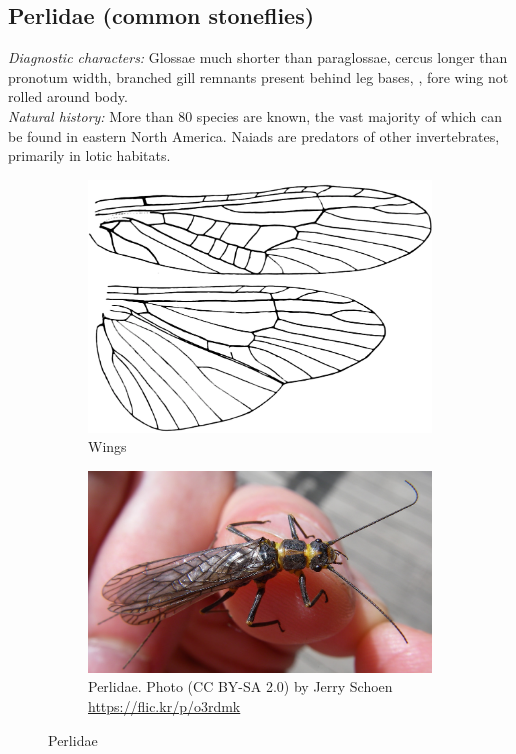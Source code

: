 \documentclass[letterpaper, 11pt]{article}
\begin{document}
\subsection{Perlidae (common stoneflies)}
\noindent{}\textit{Diagnostic characters:} Glossae much shorter than paraglossae, cercus longer than pronotum width, branched gill remnants present behind leg bases, , fore wing not rolled around body.\\

\noindent{}\textit{Natural history:} More than 80 species are known, the vast majority of which can be found in eastern North America. Naiads are predators of other invertebrates, primarily in lotic habitats.\\ 

\begin{figure}[ht!]
    \centering
    \begin{subfigure}[ht!]{0.45\textwidth}
        \includegraphics[width=\textwidth]{PerlidWings}
        \caption{Wings \citep[modified from][Plate 11, Fig. 3]{bhl29875}}
        \label{fig:perlid1}
    \end{subfigure}
    \qquad
    \begin{subfigure}[ht!]{0.45\textwidth}
        \includegraphics[width=\textwidth]{perlid}
        \caption{Perlidae. Photo (CC BY-SA 2.0) by Jerry Schoen \url{https://flic.kr/p/o3rdmk}}
        \label{fig:perlid2}
    \end{subfigure}
    \caption{Perlidae}\label{fig:perlids}
\end{figure}
\end{document}
